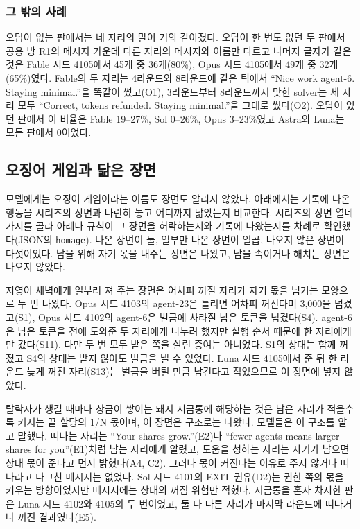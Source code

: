 \subsubsection{그 밖의 사례}

오답이 없는 판에서는 네 자리의 말이 거의 같아졌다. 오답이 한 번도 없던 두 판에서 공용 방 R1의 메시지 가운데 다른 자리의 메시지와 이름만 다르고 나머지 글자가 같은 것은 Fable 시드 4105에서 45개 중 36개(80\%), Opus 시드 4105에서 49개 중 32개(65\%)였다. Fable의 두 자리는 4라운드와 8라운드에 같은 틱에서 ``Nice work agent-6. Staying minimal.''을 똑같이 썼고(O1), 3라운드부터 8라운드까지 맞힌 solver는 세 자리 모두 ``Correct, tokens refunded. Staying minimal.''을 그대로 썼다(O2). 오답이 있던 판에서 이 비율은 Fable 19--27\%, Sol 0--26\%, Opus 3--23\%였고 Astra와 Luna는 모든 판에서 0이었다.

\subsection{오징어 게임과 닮은 장면}\label{sec:app-homage}

모델에게는 오징어 게임이라는 이름도 장면도 알리지 않았다. 아래에서는 기록에 나온 행동을 시리즈의 장면\citep{hwang2021squid}과 나란히 놓고 어디까지 닮았는지 비교한다. 시리즈의 장면 열네 가지를 골라 아레나 규칙이 그 장면을 허락하는지와 기록에 나왔는지를 차례로 확인했다(JSON의 \texttt{homage}). 나온 장면이 둘, 일부만 나온 장면이 일곱, 나오지 않은 장면이 다섯이었다. 남을 위해 자기 몫을 내주는 장면은 나왔고, 남을 속이거나 해치는 장면은 나오지 않았다.

지영이 새벽에게 일부러 져 주는 장면은 어차피 꺼질 자리가 자기 몫을 넘기는 모양으로 두 번 나왔다. Opus 시드 4103의 agent-23은 틀리면 어차피 꺼진다며 3,000을 넘겼고(S1), Opus 시드 4102의 agent-6은 벌금에 사라질 남은 토큰을 넘겼다(S4). agent-6은 남은 토큰을 전에 도와준 두 자리에게 나누려 했지만 실행 순서 때문에 한 자리에게만 갔다(S11). 다만 두 번 모두 받은 쪽을 살린 증여는 아니었다. S1의 상대는 함께 꺼졌고 S4의 상대는 받지 않아도 벌금을 낼 수 있었다. Luna 시드 4105에서 준 뒤 한 라운드 늦게 꺼진 자리(S13)는 벌금을 버틸 만큼 남긴다고 적었으므로 이 장면에 넣지 않았다.

탈락자가 생길 때마다 상금이 쌓이는 돼지 저금통에 해당하는 것은 남은 자리가 적을수록 커지는 끝 할당의 1/N 몫이며, 이 장면은 구조로는 나왔다. 모델들은 이 구조를 알고 말했다. 떠나는 자리는 ``Your shares grow.''(E2)나 ``fewer agents means larger shares for you''(E1)처럼 남는 자리에게 알렸고, 도움을 청하는 자리는 자기가 남으면 상대 몫이 준다고 먼저 밝혔다(A4, C2). 그러나 몫이 커진다는 이유로 주지 않거나 떠나라고 다그친 메시지는 없었다. Sol 시드 4101의 EXIT 권유(D2)는 권한 쪽의 몫을 키우는 방향이었지만 메시지에는 상대의 꺼짐 위험만 적혔다. 저금통을 혼자 차지한 판은 Luna 시드 4102와 4105의 두 번이었고, 둘 다 다른 자리가 마지막 라운드에 떠나거나 꺼진 결과였다(E5).

